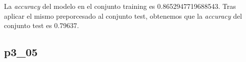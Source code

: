 \documentclass[a4]{article}
\begin{document}
La \textit{accuracy} del modelo en el conjunto training es 0.8652947719688543. Tras aplicar el mismo preporcesado al conjunto test, obtenemos que la \textit{accuracy} del conjunto test es 0.79637.

\subsection{p3\_05}
\end{document}
